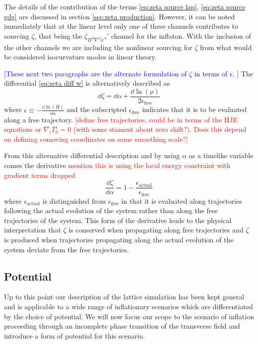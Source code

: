 The details of the contribution of the terms \eqref{eq:zeta source lap}, \eqref{eq:zeta source gdg} are discussed in section \ref{sec:zeta production}. However, it can be noted immediately that at the linear level only one of these channels contributes to sourcing $\zeta$, that being the $\zeta_{\Pi^A\nabla^2\phi^A}'$ channel for the inflaton. With the inclusion of the  other channels we are including the nonlinear sourcing for $\zeta$ from what would be considered isocurvature modes in linear theory.

\textcolor{blue}{[These next two paragraphs are the alternate formulation of $\zeta$ in terms of $\epsilon$. ]}
The differential \eqref{eq:zeta diff w} is alternatively described as
\begin{equation}
  \dd\zeta = \dd\alpha + \frac{\dd\ln(\rho)}{2\epsilon_\mathrm{free}} \label{eq:zeta diff eps}
\end{equation}
where $\epsilon \equiv -\frac{\dd\ln(H)}{\dd\alpha}$ and the subscripted $\epsilon_\mathrm{free}$ indicates that it is to be evaluated along a free trajectory. \textcolor{red}{[define free trajectories, could be in terms of the HJE equations or $\nabla_iT^i_0 = 0$ (with some stament about zero shift?). Does this depend on defining comoving coordinates on some smoothing scale?]}

From this alternative differential description and by using $\alpha$ as a timelike variable comes the derivative \textcolor{red}{mention this is using the local energy constraint with gradient terms dropped}
\begin{equation}
  \frac{\dd\zeta}{\dd\alpha} = 1 - \frac{\epsilon_\mathrm{actual}}{\epsilon_\mathrm{free}} \label{eq:zeta der alpha}
\end{equation}
where $\epsilon_\mathrm{actual}$ is distinguished from $\epsilon_\mathrm{free}$ in that it is evaluated along trajectories following the actual evolution of the system rather than along the free trajectories of the system. This form of the derivative leads to the physical interpretation that $\zeta$ is conserved when propagating along free trajectories and $\zeta$ is produced when trajectories propagating along the actual evolution of the system deviate from the free trajectories.

\subsection{Potential} \label{sec:potential}
Up to this point our description of the lattice simulation has been kept general and is applicable to a wide range of inflationary scenarios which are differentiated by the choice of potential.
We will now focus our scope to the scenario of inflation proceeding through an incomplete phase transition of the transverse field and introduce a form of potential for this scenario.

